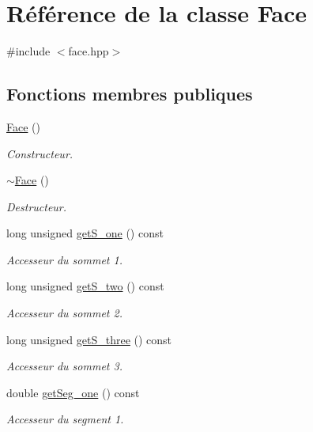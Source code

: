 \hypertarget{class_face}{\section{Référence de la classe Face}
\label{class_face}
}


{\ttfamily \#include $<$face.\-hpp$>$}

\subsection*{Fonctions membres publiques}
\begin{DoxyCompactItemize}
\item 
\hyperlink{class_face_afdb634bc2d5287ba0d62e46b57e9dc2e}{Face} ()
\begin{DoxyCompactList}\small\item\em Constructeur. \end{DoxyCompactList}\item 
\hyperlink{class_face_a182c8c9ba652d46b01fdf6816cd65590}{$\sim$\-Face} ()
\begin{DoxyCompactList}\small\item\em Destructeur. \end{DoxyCompactList}\item 
long unsigned \hyperlink{class_face_a6a71144fe15d6edfab4cec3560bdb2aa}{get\-S\-\_\-one} () const 
\begin{DoxyCompactList}\small\item\em Accesseur du sommet 1. \end{DoxyCompactList}\item 
long unsigned \hyperlink{class_face_a5b35ec67e75df789092301fab06a951b}{get\-S\-\_\-two} () const 
\begin{DoxyCompactList}\small\item\em Accesseur du sommet 2. \end{DoxyCompactList}\item 
long unsigned \hyperlink{class_face_adddc2b56135f76b623a4ffa9b7c0953f}{get\-S\-\_\-three} () const 
\begin{DoxyCompactList}\small\item\em Accesseur du sommet 3. \end{DoxyCompactList}\item 
double \hyperlink{class_face_a906d16f2f1c9adbe881ae46ee7f3e3e9}{get\-Seg\-\_\-one} () const 
\begin{DoxyCompactList}\small\item\em Accesseur du segment 1. \end{DoxyCompactList}\item 

\end{DoxyCompactItemize}
